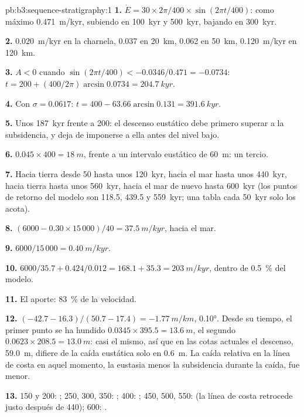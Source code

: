 \begin{solution}{pb:b3:sequence-stratigraphy:1}
\textbf{1.} $\dot E = 30\times2\pi/400\times\sin(2\pi t/400)$: como máximo
\qty{0.471}{m/kyr}, subiendo en \qty{100}{kyr} y \qty{500}{kyr}, bajando en
\qty{300}{kyr}.

\textbf{2.} \qty{0.020}{m/kyr} en la charnela, 0.037 en \qty{20}{km}, 0.062 en
\qty{50}{km}, \qty{0.120}{m/kyr} en \qty{120}{km}.

\textbf{3.} $A < 0$ cuando $\sin(2\pi t/400) < -0.0346/0.471 = -0.0734$: $t =
200 + (400/2\pi)\arcsin0.0734 = \qty{204.7}{kyr}$.

\textbf{4.} Con $\sigma = 0.0617$: $t = 400 - 63.66\arcsin0.131 =
\qty{391.6}{kyr}$.

\textbf{5.} Unos \qty{187}{kyr} frente a 200: el descenso eustático debe primero
superar a la subsidencia, y deja de imponerse a ella antes del nivel bajo.

\textbf{6.} $0.045\times400 = \qty{18}{m}$, frente a un intervalo eustático de
\qty{60}{m}: un tercio.

\textbf{7.} Hacia tierra desde 50 hasta unos \qty{120}{kyr}, hacia el mar hasta unos
\qty{440}{kyr}, hacia tierra hasta unos \qty{560}{kyr}, hacia el mar de nuevo hasta
\qty{600}{kyr} (los puntos de retorno del modelo son 118.5, 439.5 y
\qty{559}{kyr}; una tabla cada \qty{50}{kyr} solo los acota).

\textbf{8.} $(6000 - 0.30\times15\,000)/40 = \qty{37.5}{m/kyr}$, hacia el mar.

\textbf{9.} $6000/15\,000 = \qty{0.40}{m/kyr}$.

\textbf{10.} $6000/35.7 + 0.424/0.012 = 168.1 + 35.3 = \qty{203}{m/kyr}$,
dentro de \qty{0.5}{\percent} del modelo.

\textbf{11.} El aporte: \qty{83}{\percent} de la velocidad.

\textbf{12.} $(-42.7 - 16.3)/(50.7 - 17.4) = \qty{-1.77}{m/km}$, \ang{0.10}.
Desde su tiempo, el primer punto se ha hundido $0.0345\times395.5 =
\qty{13.6}{m}$, el segundo $0.0623\times208.5 = \qty{13.0}{m}$: casi el
mismo, así que en las cotas actuales el descenso, \qty{59.0}{m}, difiere de la
caída eustática solo en \qty{0.6}{m}. La caída relativa en la línea de costa en
aquel momento, la eustasia menos la subsidencia durante la caída, fue menor.

\textbf{13.} 150 y 200: ; 250, 300, 350: ; 400:
; 450, 500, 550:  (la línea de costa retrocede justo después de
440); 600: .


\end{solution}
